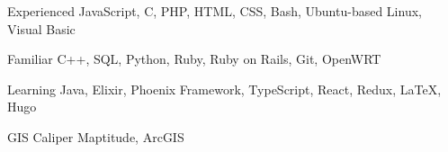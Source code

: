 

\begin{cvskills}

  \cvskill
    {Experienced} %
    {JavaScript, C, PHP, HTML, CSS, Bash, Ubuntu-based Linux, Visual Basic} %

  \cvskill
    {Familiar} %
    {C++, SQL, Python, Ruby, Ruby on Rails, Git, OpenWRT} %
    
  \cvskill
    {Learning} %
    {Java, Elixir, Phoenix Framework, TypeScript, React, Redux, \LaTeX, Hugo} %
    
  \cvskill
    {GIS} %
    {Caliper Maptitude, ArcGIS} %


\end{cvskills}
